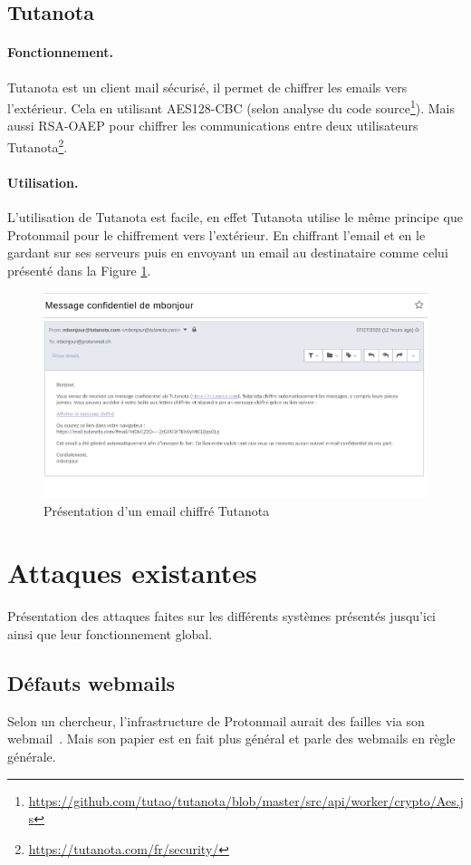 \subsection{Tutanota}
\paragraph*{Fonctionnement.}
Tutanota est un client mail sécurisé, il permet de chiffrer les emails vers l'extérieur. Cela en utilisant AES128-CBC (selon analyse du code source\footnote{\url{https://github.com/tutao/tutanota/blob/master/src/api/worker/crypto/Aes.js}}). Mais aussi RSA-OAEP pour chiffrer les communications entre deux utilisateurs Tutanota\footnote{\url{https://tutanota.com/fr/security/}}.
\paragraph*{Utilisation.}
L'utilisation de Tutanota est facile, en effet Tutanota utilise le même principe que Protonmail pour le chiffrement vers l'extérieur. En chiffrant l'email et en le gardant sur ses serveurs puis en envoyant un email au destinataire comme celui présenté dans la Figure \ref{fig:TutanotaPres}.

\begin{figure}[h!]
	\includegraphics[width=14cm]{images/tutanotaPresentation.png}
	\centering
	\caption{Présentation d'un email chiffré Tutanota}
	\label{fig:TutanotaPres}
\end{figure}

\section{Attaques existantes}
Présentation des attaques faites sur les différents systèmes présentés jusqu'ici ainsi que leur fonctionnement global.
\subsection{Défauts webmails}
Selon un chercheur, l'infrastructure de Protonmail aurait des failles via son webmail~\cite{journals/iacr/Kobeissi18a}. Mais son papier est en fait plus général et parle des webmails en règle générale.

